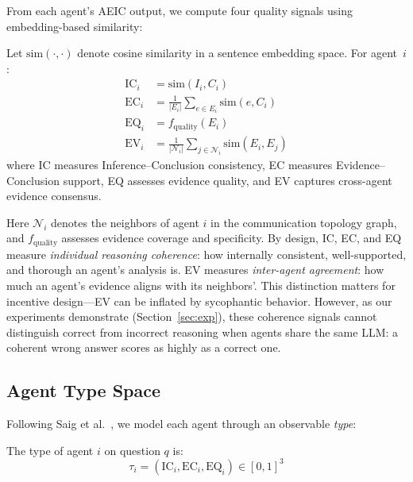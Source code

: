 From each agent's AEIC output, we compute four quality signals using embedding-based similarity:

\begin{definition}
Let $\mathrm{sim}(\cdot, \cdot)$ denote cosine similarity in a sentence embedding space. For agent~$i$:
\begin{align}
    \mathrm{IC}_i &= \mathrm{sim}(I_i, C_i) \\
    \mathrm{EC}_i &= \tfrac{1}{|E_i|}\textstyle\sum_{e \in E_i} \mathrm{sim}(e, C_i) \\
    \mathrm{EQ}_i &= f_{\mathrm{quality}}(E_i) \\
    \mathrm{EV}_i &= \tfrac{1}{|\mathcal{N}_i|}\textstyle\sum_{j \in \mathcal{N}_i} \mathrm{sim}(E_i, E_j)
\end{align}
where IC measures Inference--Conclusion consistency, EC measures Evidence--Conclusion support, EQ assesses evidence quality, and EV captures cross-agent evidence consensus.
\end{definition}

Here $\mathcal{N}_i$ denotes the neighbors of agent $i$ in the communication topology graph, and $f_{\text{quality}}$ assesses evidence coverage and specificity. By design, IC, EC, and EQ measure \emph{individual reasoning coherence}: how internally consistent, well-supported, and thorough an agent's analysis is. EV measures \emph{inter-agent agreement}: how much an agent's evidence aligns with its neighbors'. This distinction matters for incentive design---EV can be inflated by sycophantic behavior. However, as our experiments demonstrate (Section~\ref{sec:exp}), these coherence signals cannot distinguish correct from incorrect reasoning when agents share the same LLM: a coherent wrong answer scores as highly as a correct one.

\subsection{Agent Type Space}
\label{sec:type}

Following Saig et al.~\cite{saig2024incentivizing}, we model each agent through an observable \emph{type}:

\begin{definition}
The type of agent $i$ on question $q$ is:
\begin{equation}
    \tau_i = (\text{IC}_i, \text{EC}_i, \text{EQ}_i) \in [0,1]^3
\end{equation}
\end{definition}


